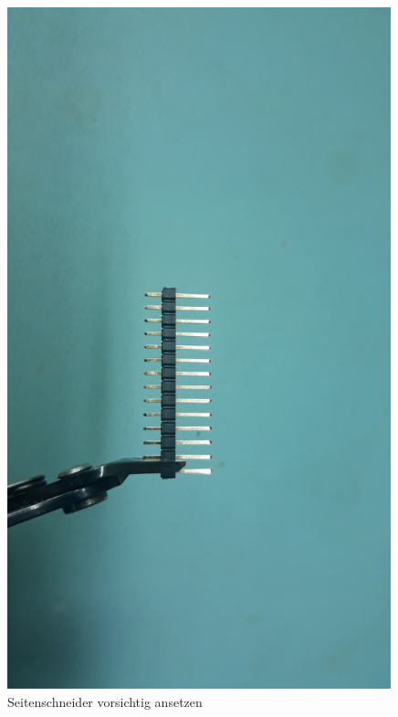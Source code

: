 \documentclass[12pt, a4paper]{article}		%
\begin{document}
\begin{minipage}[t]{0.49\textwidth}
\begin{figure}[H]
	\centering
		\includegraphics[width=0.99\textwidth]{Grafiken/20200726_121903.jpg}
	\caption{Seitenschneider vorsichtig ansetzen}
	\label{fig:20200726_121444}
\end{figure}
\end{minipage}
\end{document}
